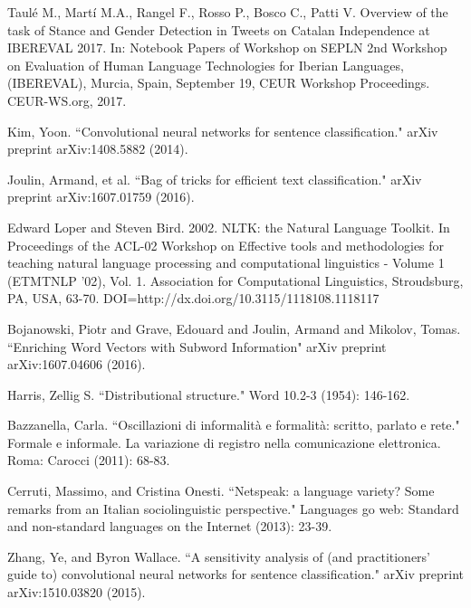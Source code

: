 \begin{thebibliography}{1}

Taulé M., Martí M.A., Rangel F., Rosso P., Bosco C., Patti V. 
Overview of the task of Stance and Gender Detection in Tweets on Catalan Independence at IBEREVAL 2017. 
In: Notebook Papers of Workshop on SEPLN 2nd Workshop on Evaluation of Human Language Technologies for Iberian Languages, (IBEREVAL), Murcia, Spain, September 19, CEUR Workshop Proceedings. CEUR-WS.org, 2017.

Kim, Yoon. ``Convolutional neural networks for sentence classification." arXiv preprint arXiv:1408.5882 (2014).

Joulin, Armand, et al. ``Bag of tricks for efficient text classification." arXiv preprint arXiv:1607.01759 (2016).

Edward Loper and Steven Bird. 2002. NLTK: the Natural Language Toolkit. In Proceedings of the ACL-02 Workshop on Effective tools and methodologies for teaching natural language processing and computational linguistics - Volume 1 (ETMTNLP '02), Vol. 1. Association for Computational Linguistics, Stroudsburg, PA, USA, 63-70. DOI=http://dx.doi.org/10.3115/1118108.1118117


Bojanowski, Piotr and Grave, Edouard and Joulin, Armand and Mikolov, Tomas. ``Enriching Word Vectors with Subword Information" arXiv preprint arXiv:1607.04606 (2016).

Harris, Zellig S. ``Distributional structure." Word 10.2-3 (1954): 146-162.

Bazzanella, Carla. ``Oscillazioni di informalità e formalità: scritto, parlato e rete." Formale e informale. La variazione di registro nella comunicazione elettronica. Roma: Carocci (2011): 68-83.

Cerruti, Massimo, and Cristina Onesti. ``Netspeak: a language variety? Some remarks from an Italian sociolinguistic perspective." Languages go web: Standard and non-standard languages on the Internet (2013): 23-39.

Zhang, Ye, and Byron Wallace. ``A sensitivity analysis of (and practitioners' guide to) convolutional neural networks for sentence classification." arXiv preprint arXiv:1510.03820 (2015).


\end{thebibliography}
